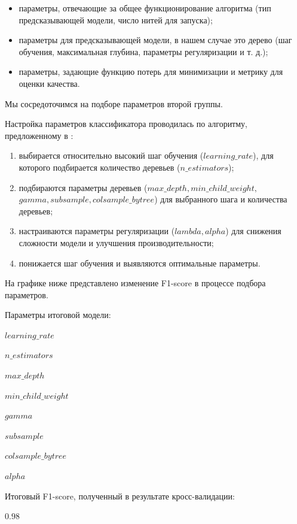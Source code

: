 \documentclass[a4paper,12pt]{article}
\begin{document}
\begin{itemize}

	\item параметры, отвечающие за общее функционирование алгоритма (тип предсказывающей модели, число нитей для запуска);
	\item параметры для предсказывающей модели, в нашем случае это дерево (шаг обучения, максимальная глубина, параметры регуляризации и т. д.);
	\item параметры, задающие функцию потерь для минимизации и метрику для оценки качества.

\end{itemize}

Мы сосредоточимся на подборе параметров второй группы.

Настройка параметров классификатора проводилась по алгоритму, предложенному в \cite{link7}:

\begin{enumerate}

	\item выбирается относительно высокий шаг обучения ($learning\_rate$), для которого подбирается количество деревьев ($n\_estimators$);
	\item подбираются параметры деревьев ($max\_depth, min\_child\_weight,$ $gamma, subsample, colsample\_bytree$) для выбранного шага и количества деревьев;
	\item настраиваются параметры регуляризации ($lambda, alpha$) для снижения сложности модели и улучшения производительности; 
	\item понижается шаг обучения и выявляются оптимальные параметры.

\end{enumerate}	

На графике ниже представлено изменение F1-score в процессе подбора параметров. 

Параметры итоговой модели:

$learning\_rate$

$n\_estimators$

$max\_depth$

$min\_child\_weight$

$gamma$

$subsample$

$colsample\_bytree$

$alpha$

Итоговый F1-score, полученный в результате кросс-валидации:

 $0.98$

\newpage
\end{document}
